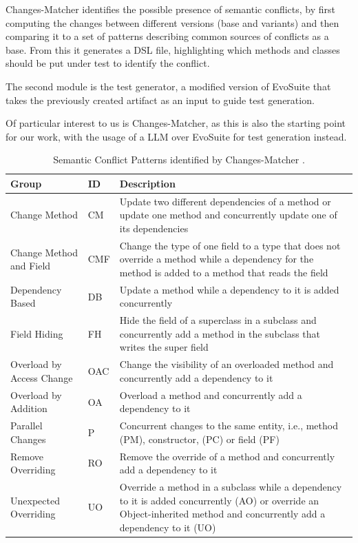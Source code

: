 Changes-Matcher identifies the possible presence of semantic conflicts, by first computing the changes between different versions (base and variants) and then comparing it to a set of patterns describing common sources of conflicts as a base. From this it generates a DSL file, highlighting which methods and classes should be put under test to identify the conflict.

The second module is the test generator, a modified version of EvoSuite that takes the previously created artifact as an input to guide test generation.

Of particular interest to us is Changes-Matcher, as this is also the starting point for our work, with the usage of a LLM over EvoSuite for test generation instead.
\begin{table}[!h]
\setlength\extrarowheight{2pt}
\begin{tabularx}{\textwidth}{|l|l|X|}
 \hline
 Group & ID & Description \\ [0.5ex] 
 \hline\hline
 Change Method  & CM & Update two different dependencies of a method or update one method and concurrently update one of its
dependencies \\ 
 \hline
 Change Method
and Field & CMF & Change the type of one field to a type that does not
override a method while a dependency for the method
is added to a method that reads the field
 \\
 \hline
 Dependency
Based & DB & Update a method while a dependency to it is added
concurrently \\
 \hline
 Field Hiding & FH & Hide the field of a superclass in a subclass and concurrently add a method in the subclass that writes the
super field
 \\
 \hline
 Overload by Access Change & OAC & Change the visibility of an overloaded method and
concurrently add a dependency to it \\ 
 \hline
 Overload by Addition & OA & Overload a method and concurrently add a dependency to it \\  
 \hline
 Parallel Changes & P & Concurrent changes to the same entity, i.e., method
(PM), constructor, (PC) or field (PF) \\ 
 \hline
 Remove Overriding & RO & Remove the override of a method and concurrently
add a dependency to it \\  
  \hline
 Unexpected Overriding & UO & Override a method in a subclass while a dependency to it is added concurrently (AO) or override an
Object-inherited method and concurrently add a dependency to it (UO) \\ [1ex] 
 \hline
\end{tabularx}
\caption{\label{pattern-table}Semantic Conflict Patterns identified by Changes-Matcher \citep{kn:nuno}.}
\end{table}

